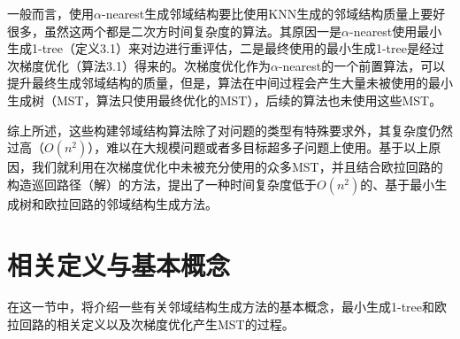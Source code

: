 \par
一般而言，使用$\alpha$-nearest生成邻域结构要比使用KNN生成的邻域结构质量上要好很多，虽然这两个都是二次方时间复杂度的算法。其原因一是$\alpha$-nearest使用最小生成1-tree（定义3.1）来对边进行重评估，二是最终使用的最小生成1-tree是经过次梯度优化（算法3.1）得来的。次梯度优化作为$\alpha$-nearest的一个前置算法，可以提升最终生成邻域结构的质量，但是，算法在中间过程会产生大量未被使用的最小生成树（MST，算法只使用最终优化的MST），后续的算法也未使用这些MST。 
\par
综上所述，这些构建邻域结构算法除了对问题的类型有特殊要求外，其复杂度仍然过高（$O(n^2)$），难以在大规模问题或者多目标超多子问题上使用。基于以上原因，我们就利用在次梯度优化中未被充分使用的众多MST，并且结合欧拉回路的构造巡回路径（解）的方法，提出了一种时间复杂度低于$O(n^2)$的、基于最小生成树和欧拉回路的邻域结构生成方法。

\section{相关定义与基本概念}
\label{sec:NS_Method:相关定义与基本概念}
在这一节中，将介绍一些有关邻域结构生成方法的基本概念，最小生成1-tree和欧拉回路的相关定义以及次梯度优化产生MST的过程。

